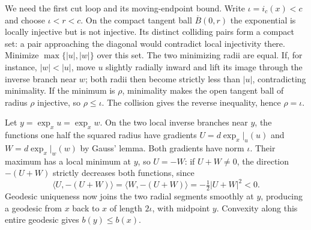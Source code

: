 We need the first cut loop and its moving-endpoint bound.  Write
$\iota=i_c(x)<c$ and choose $\iota<r<c$.  On the compact
tangent ball $\overline B(0,r)$ the exponential is locally
injective but is not injective.  Its distinct colliding pairs form
a compact set: a pair approaching the diagonal would contradict
local injectivity there.  Minimize $\max\{|u|,|w|\}$ over
this set.  The two minimizing radii are equal.  If, for instance,
$|w|<|u|$, move $u$ slightly radially inward and lift its image
through the inverse branch near $w$; both radii then become strictly
less than $|u|$, contradicting minimality.  If the minimum is
$\rho$, minimality makes the open tangent ball of radius $\rho$
injective, so $\rho\leq\iota$.  The collision gives the reverse
inequality, hence $\rho=\iota$.

Let $y=\exp_xu=\exp_xw$.  On the two local inverse branches
near $y$, the functions one half the squared radius have gradients
$U=d\exp_x|_u(u)$ and $W=d\exp_x|_w(w)$ by Gauss' lemma.
Both gradients have norm $\iota$.  Their maximum has a local
minimum at $y$, so $U=-W$: if $U+W\ne0$, the direction
$-(U+W)$ strictly decreases both functions, since
\[
 \langle U,-(U+W)\rangle
 =\langle W,-(U+W)\rangle=-\tfrac12|U+W|^2<0.
\]
Geodesic uniqueness now joins the two radial segments smoothly at
$y$, producing a geodesic from $x$ back to $x$ of length
$2\iota$, with midpoint $y$.  Convexity along this entire
geodesic gives $b(y)\leq b(x)$.

